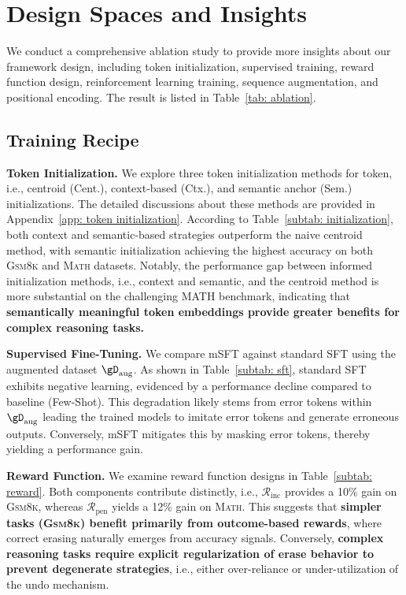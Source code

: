 
\section{Design Spaces and Insights}
We conduct a comprehensive ablation study to provide more insights about our framework design, including token initialization, supervised training, reward function design, reinforcement learning training, sequence augmentation, and positional encoding.
The result is listed in Table~\ref{tab: ablation}.

\subsection{Training Recipe} \label{sec: ablation training recipe}

\textbf{Token Initialization.}
We explore three token initialization methods for \bk token, i.e., centroid (Cent.), context-based (Ctx.), and semantic anchor (Sem.) initializations. 
The detailed discussions about these methods are provided in Appendix~\ref{app: token initialization}.
According to Table~\ref{subtab: initialization}, both context and semantic-based strategies outperform the naive centroid method, with semantic initialization achieving the highest accuracy on both \textsc{Gsm8k} and \textsc{Math} datasets.
Notably, the performance gap between informed initialization methods, i.e., context and semantic, and the centroid method is more substantial on the challenging MATH benchmark, indicating that \textbf{semantically meaningful token embeddings provide greater benefits for complex reasoning tasks.}

\textbf{Supervised Fine-Tuning.} 
We compare mSFT against standard SFT using the augmented dataset $\gD_\text{aug}$. 
As shown in Table~\ref{subtab: sft}, standard SFT exhibits negative learning, evidenced by a performance decline compared to baseline (Few-Shot).
This degradation likely stems from error tokens within $\gD_\text{aug}$ leading the trained models to imitate error tokens and generate erroneous outputs. 
Conversely, mSFT mitigates this by masking error tokens, thereby yielding a performance gain.



\textbf{Reward Function.} 
We examine reward function designs in Table~\ref{subtab: reward}. 
Both components contribute distinctly, i.e., $\mathcal{R}_\text{inc}$ provides a 10\% gain on \textsc{Gsm8k}, whereas $\mathcal{R}_\text{pen}$ yields a 12\% gain on \textsc{Math}. 
This suggests that \textbf{simpler tasks (\textsc{Gsm8k}) benefit primarily from outcome-based rewards}, where correct erasing naturally emerges from accuracy signals. 
Conversely, \textbf{complex reasoning tasks require explicit regularization of erase behavior to prevent degenerate strategies}, i.e., either over-reliance or under-utilization of the undo mechanism.

